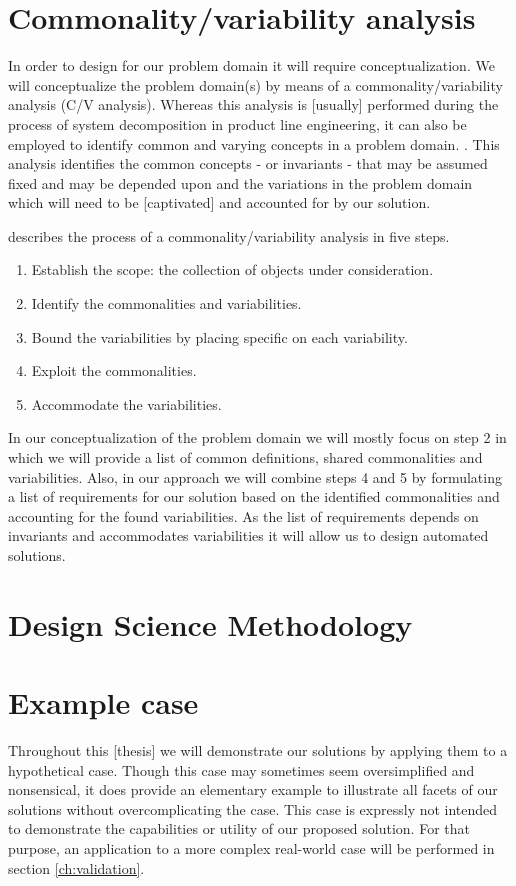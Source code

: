 \section{Commonality/variability analysis}
\label{sec:back:cv_analysis}
In order to design for our problem domain it will require conceptualization. We will conceptualize the problem domain(s) by means of a commonality/variability analysis (C/V analysis). Whereas this analysis is [usually] performed during the process of system decomposition in product line engineering, it can also be employed to identify common and varying concepts in a problem domain. \cite{cva_problem_domain}.  This analysis identifies the common concepts - or invariants - that may be assumed fixed and may be depended upon and the variations in the problem domain which will need to be [captivated] and accounted for by our solution.

\cite{cv_analysis} describes the process of a commonality/variability analysis in five steps.

\begin{enumerate}
\nospace
\item Establish the scope: the collection of objects
under consideration.
\item Identify the commonalities and variabilities.
\item Bound the variabilities by placing specific on each variability.
\item Exploit the commonalities.
\item Accommodate the variabilities.
\end{enumerate}

In our conceptualization of the problem domain we will mostly focus on step 2 in which we will provide a list of common definitions, shared commonalities and variabilities. Also, in our approach we will combine steps 4 and 5 by formulating a list of requirements for our solution based on the identified commonalities and accounting for the found variabilities. As the list of requirements depends on invariants and accommodates variabilities it will allow us to design automated solutions.



\section{Design Science Methodology}
\label{sec:back:dsm}
\section{Example case}
\label{sec:example_case}
Throughout this [thesis] we will demonstrate our solutions by applying them to a hypothetical case. Though this case may sometimes seem oversimplified and nonsensical, it does provide an elementary example to illustrate all facets of our solutions without overcomplicating the case. This case is expressly not intended to demonstrate the capabilities or utility of our proposed solution. For that purpose, an application to a more complex real-world case will be performed in section \ref{ch:validation}. 

